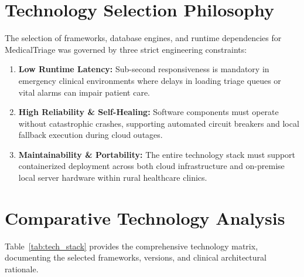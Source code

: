 \documentclass[11pt,a4paper,oneside]{report}
\begin{document}
\section{Technology Selection Philosophy}
The selection of frameworks, database engines, and runtime dependencies for MedicalTriage was governed by three strict engineering constraints:
\begin{enumerate}[leftmargin=20pt]
  \item \textbf{Low Runtime Latency:} Sub-second responsiveness is mandatory in emergency clinical environments where delays in loading triage queues or vital alarms can impair patient care.
  \item \textbf{High Reliability \& Self-Healing:} Software components must operate without catastrophic crashes, supporting automated circuit breakers and local fallback execution during cloud outages.
  \item \textbf{Maintainability \& Portability:} The entire technology stack must support containerized deployment across both cloud infrastructure and on-premise local server hardware within rural healthcare clinics.
\end{enumerate}

\section{Comparative Technology Analysis}
Table~\ref{tab:tech_stack} provides the comprehensive technology matrix, documenting the selected frameworks, versions, and clinical architectural rationale.
\end{document}
